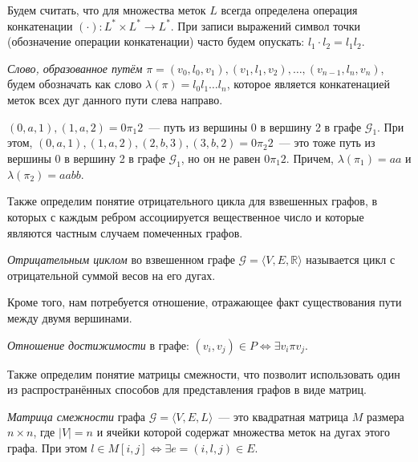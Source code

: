 Будем считать, что для множества меток $L$ всегда определена операция конкатенации $(\cdot): L^* \times L^* \to L^*$. При записи выражений символ точки (обозначение операции конкатенации) часто будем опускать: $l_1 \cdot l_2 = l_1l_2$.

\begin{definition}
	\textit{Слово, образованное путём} $\pi = (v_0, l_0, v_1), (v_1, l_1, v_2), \dots, (v_{n - 1}, l_n, v_n)$,  будем обозначать как слово $\lambda(\pi) = l_0 l_1 \ldots l_n$, которое является конкатенацией меток всех дуг данного пути слева направо.
\end{definition}

\begin{example}
	$(0, a, 1), (1, a, 2) = 0 \pi_1 2$~--- путь из вершины 0 в вершину 2 в графе $\mathcal{G}_1$.
	При этом, $(0, a, 1), (1, a, 2), (2, b, 3), (3, b, 2) = 0 \pi_2 2$~--- это тоже путь из вершины 0 в вершину 2 в графе $\mathcal{G}_1$, но он не равен $0 \pi_1 2$. Причем, $\lambda(\pi_1) = aa$ и $\lambda(\pi_2) = aabb$.
\end{example}

Также определим понятие отрицательного цикла для взвешенных графов, в которых с каждым ребром ассоциируется вещественное число и которые являются частным случаем помеченных графов.

\begin{definition}
	\textit{Отрицательным циклом} во взвешенном графе $\mathcal{G} = \langle V, E, \mathbb{R} \rangle$ называется цикл с отрицательной суммой весов на его дугах.
\end{definition}

Кроме того, нам потребуется отношение, отражающее факт существования пути между двумя вершинами.

\begin{definition} \label{def:reach}
	\textit{Отношение достижимости} в графе:
	$(v_i, v_j) \in P \iff \exists v_i \pi v_j$.
\end{definition}

Также определим понятие матрицы смежности, что позволит использовать один из распространённых способов для представления графов в виде матриц.

\begin{definition}
	\textit{Матрица смежности} графа $\mathcal{G}=\langle V, E, L \rangle$~--- это квадратная матрица $M$ размера $n \times n$, где $|V| = n$ и ячейки которой содержат множества меток на дугах этого графа.	При этом $l \in M[i, j] \iff \exists e = (i, l, j) \in E$.
\end{definition}

